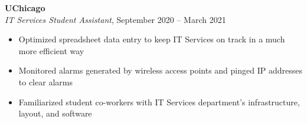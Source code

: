 \documentclass[
]{article}
\providecommand{\tightlist}{%
  \setlength{\itemsep}{0pt}\setlength{\parskip}{0pt}}
\begin{document}
\textbf{UChicago}\\
\emph{IT Services Student Assistant}, September %
2020 -- March %
2021

\begin{itemize}
\tightlist
\item
  Optimized spreadsheet data entry to keep IT Services on track in a
  much more efficient way
\end{itemize}

\begin{itemize}
\item
  Monitored alarms generated by wireless access points and pinged IP
  addresses to clear alarms
\item
  Familiarized student co-workers with IT Services department's
  infrastructure, layout, and software
\end{itemize}






\end{document}
